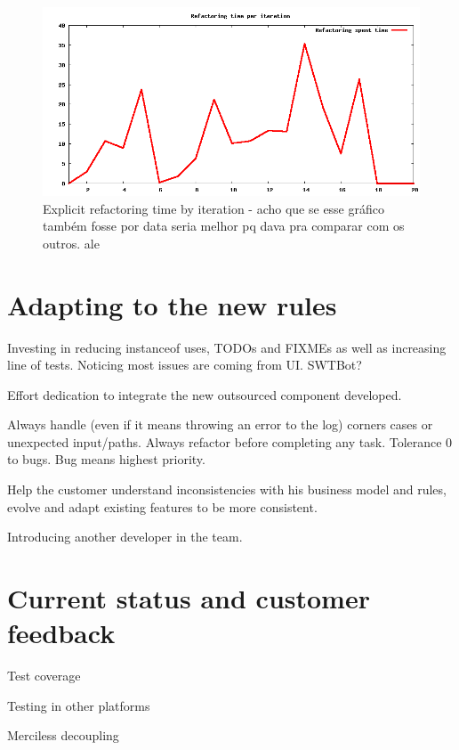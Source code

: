 \documentclass[lnbip]{svmultln}
\begin{document}
\begin{figure}[hbt]
  \centerline{
    \includegraphics[width=120mm]{refactoring.png}
  }
  \caption{Explicit refactoring time by iteration - acho que se esse gráfico também fosse por data seria melhor pq dava pra comparar com os outros. ale}
  \label{fig:refactoring}
\end{figure}

\section{Adapting to the new rules}
\label{sec:adapting}

Investing in reducing instanceof uses, TODOs and FIXMEs as well as
increasing line of tests. Noticing most issues are coming from
UI. SWTBot?

Effort dedication to integrate the new outsourced component developed.

Always handle (even if it means throwing an error to the log) corners
cases or unexpected input/paths. Always refactor before completing any
task. Tolerance 0 to bugs. Bug means highest priority.

Help the customer understand inconsistencies with his business model and rules, evolve and adapt existing features to be more consistent.

Introducing another developer in the team.

\section{Current status and customer feedback}
\label{sec:nowadays}

Test coverage

Testing in other platforms

Merciless decoupling
\end{document}
